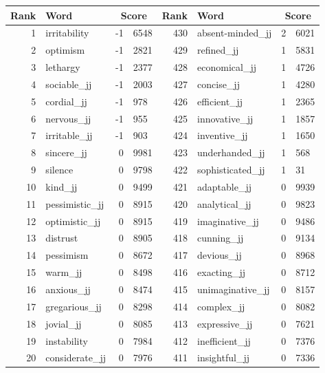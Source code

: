 \begin{table}[tbp]
    \begin{tabular}{| rlr@{.}l | rlr@{.}l |}
    \hline
    \textbf{Rank} & \textbf{Word} & \multicolumn{2}{c|}{\textbf{Score}} & \textbf{Rank} & \textbf{Word} & \multicolumn{2}{c|}{\textbf{Score}} \\
    \hline
    1 & irritability & -1 & 6548    &    430 & absent-minded\_jj & 2 & 6021 \\
    2 & optimism & -1 & 2821    &    429 & refined\_jj & 1 & 5831 \\
    3 & lethargy & -1 & 2377    &    428 & economical\_jj & 1 & 4726 \\
    4 & sociable\_jj & -1 & 2003    &    427 & concise\_jj & 1 & 4280 \\
    5 & cordial\_jj & -1 & 978    &    426 & efficient\_jj & 1 & 2365 \\
    6 & nervous\_jj & -1 & 955    &    425 & innovative\_jj & 1 & 1857 \\
    7 & irritable\_jj & -1 & 903    &    424 & inventive\_jj & 1 & 1650 \\
    8 & sincere\_jj & 0 & 9981    &    423 & underhanded\_jj & 1 & 568 \\
    9 & silence & 0 & 9798    &    422 & sophisticated\_jj & 1 & 31 \\
    10 & kind\_jj & 0 & 9499    &    421 & adaptable\_jj & 0 & 9939 \\
    11 & pessimistic\_jj & 0 & 8915    &    420 & analytical\_jj & 0 & 9823 \\
    12 & optimistic\_jj & 0 & 8915    &    419 & imaginative\_jj & 0 & 9486 \\
    13 & distrust & 0 & 8905    &    418 & cunning\_jj & 0 & 9134 \\
    14 & pessimism & 0 & 8672    &    417 & devious\_jj & 0 & 8968 \\
    15 & warm\_jj & 0 & 8498    &    416 & exacting\_jj & 0 & 8712 \\
    16 & anxious\_jj & 0 & 8474    &    415 & unimaginative\_jj & 0 & 8157 \\
    17 & gregarious\_jj & 0 & 8298    &    414 & complex\_jj & 0 & 8082 \\
    18 & jovial\_jj & 0 & 8085    &    413 & expressive\_jj & 0 & 7621 \\
    19 & instability & 0 & 7984    &    412 & inefficient\_jj & 0 & 7376 \\
    20 & considerate\_jj & 0 & 7976    &    411 & insightful\_jj & 0 & 7336 \\

\end{tabular}
\end{table}
